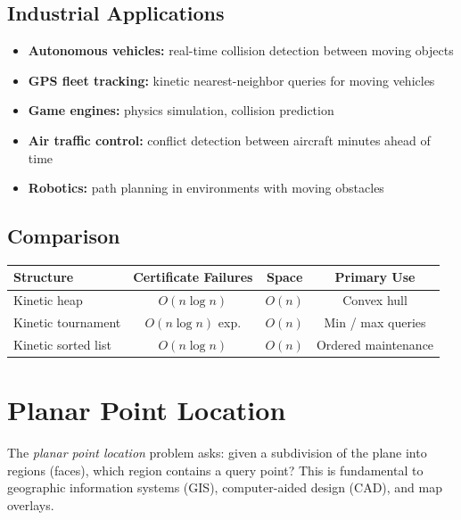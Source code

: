 \subsection{Industrial Applications}

\begin{itemize}
    \item \textbf{Autonomous vehicles:} real-time collision detection between moving objects
    \item \textbf{GPS fleet tracking:} kinetic nearest-neighbor queries for moving vehicles
    \item \textbf{Game engines:} physics simulation, collision prediction
    \item \textbf{Air traffic control:} conflict detection between aircraft minutes ahead of time
    \item \textbf{Robotics:} path planning in environments with moving obstacles
\end{itemize}

\subsection{Comparison}

\begin{center}
\begin{tabular}{lccc}
\toprule
Structure & Certificate Failures & Space & Primary Use \\
\midrule
Kinetic heap & $O(n \log n)$ & $O(n)$ & Convex hull \\
Kinetic tournament & $O(n \log n)$ exp. & $O(n)$ & Min / max queries \\
Kinetic sorted list & $O(n \log n)$ & $O(n)$ & Ordered maintenance \\
\bottomrule
\end{tabular}
\end{center}


\section{Planar Point Location}
\label{sec:planar-point-location}

The \emph{planar point location} problem asks: given a subdivision of the plane into regions (faces), which region contains a query point? This is fundamental to geographic information systems (GIS), computer-aided design (CAD), and map overlays.

